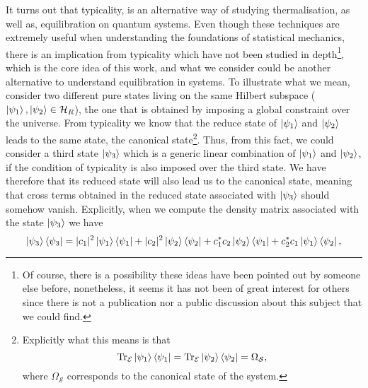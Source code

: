 \indent It turns out that typicality, is an alternative way of studying thermalisation, as well as, equilibration on quantum systems. Even though these techniques are extremely useful when understanding the foundations of statistical mechanics, there is an implication from typicality which have not been studied in depth\footnote{Of course, there is a possibility these ideas have been pointed out by someone else before, nonetheless, it seems it has not been of great interest for others since there is not a publication nor a public discussion about this subject that we could find.}, which is the core idea of this work, and what we consider could be another alternative to understand equilibration in systems. To illustrate what we mean, consider two different pure states living on the same Hilbert subspace ($\mathinner{|{\psi_1}\rangle},\mathinner{|{\psi_2}\rangle} \in \mathcal{H}_{R}$), the one that is obtained by imposing a global constraint over the universe. From typicality we know that the reduce state of $\mathinner{|{\psi_1}\rangle}$ and $\mathinner{|{\psi_2}\rangle}$ leads to the same state, the canonical state\footnote{Explicitly what this means is that
\begin{equation*}
\operatorname{Tr}_{\mathcal{E}}\mathinner{|{\psi_1}\rangle}\mathinner{\langle{\psi_1}|}=\operatorname{Tr}_{\mathcal{E}}\mathinner{|{\psi_2}\rangle}\mathinner{\langle{\psi_2}|}=\Omega_{\mathcal{S}},
\end{equation*}
where $\Omega_{\mathcal{S}}$ corresponds to the canonical state of the system.}.
Thus, from this fact, we could consider a third state $\mathinner{|{\psi_3}\rangle}$ which is a generic linear combination of $\mathinner{|{\psi_1}\rangle}$ and $\mathinner{|{\psi_2}\rangle}$, if the condition of typicality is also imposed over the third state. We have therefore that its reduced state will also lead us to the canonical state, meaning that cross terms obtained in the reduced state associated with $\mathinner{|{\psi_3}\rangle}$ should somehow vanish. Explicitly, when we compute the density matrix associated with the state $\mathinner{|{\psi_3}\rangle}$ we have 
\begin{equation}
\mathinner{|{\psi_3}\rangle}\mathinner{\langle{\psi_3}|} = |c_1|^2 \mathinner{|{\psi_1}\rangle}\mathinner{\langle{\psi_1}|} + |c_2|^2 \mathinner{|{\psi_2}\rangle}\mathinner{\langle{\psi_2}|}+c_1^*c_2\mathinner{|{\psi_2}\rangle}\mathinner{\langle{\psi_1}|} + c_2^*c_1\mathinner{|{\psi_1}\rangle}\mathinner{\langle{\psi_2}|},
\end{equation}
